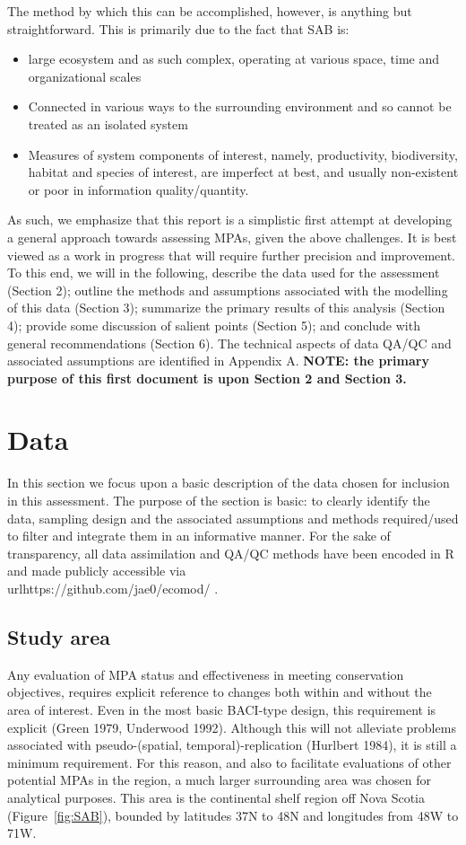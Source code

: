 \documentclass[letterpaper,portrait,11pt]{scrartcl}
\numberwithin{equation}{section}		%
\numberwithin{figure}{section}		%
\numberwithin{table}{section}				%
\begin{document}
The method by which this can be accomplished, however, is anything but straightforward. This is primarily due to the fact that SAB is:

\begin{itemize}
	\item large ecosystem and as such complex, operating at various space, time and organizational scales
	\item Connected in various ways to the surrounding environment and so cannot be treated as an isolated system
	\item Measures of system components of interest, namely, productivity, biodiversity, habitat and species of interest, are imperfect at best, and usually non-existent or poor in information quality/quantity.
\end{itemize}

As such, we emphasize that this report is a simplistic first attempt at developing a general approach towards assessing MPAs, given the above challenges. It is best viewed as a work in progress that will require further precision and improvement.
To this end, we will in the following, describe the data used for the assessment (Section 2); outline the methods and assumptions associated with the modelling of this data (Section 3); summarize the primary results of this analysis (Section 4); provide some discussion of salient points (Section 5); and conclude with general recommendations (Section 6). The technical aspects of data QA/QC and associated assumptions are identified in Appendix A.
\textbf{NOTE: the primary purpose of this first document is upon Section 2 and Section 3. }

\section{Data} 
In this section we focus upon a basic description of the data chosen for inclusion in this assessment. The purpose of the section is basic: to clearly identify the data, sampling design and the associated assumptions and methods required/used to filter and integrate them in an informative manner. For the sake of transparency, all data assimilation and QA/QC methods have been encoded in R \cite{rCran} and made publicly accessible via \\url{https://github.com/jae0/ecomod/} . 


\subsection{Study area}
Any evaluation of MPA status and effectiveness in meeting conservation objectives, requires explicit reference to changes both within and without the area of interest. Even in the most basic BACI-type design, this requirement is explicit (Green 1979, Underwood 1992). Although this will not alleviate problems associated with pseudo-(spatial, temporal)-replication (Hurlbert 1984), it is still a minimum requirement. For this reason, and also to facilitate evaluations of other potential MPAs in the region, a much larger surrounding area was chosen for analytical purposes. This area is the continental shelf region off Nova Scotia (Figure~\ref{fig:SAB}), bounded by latitudes 37N to 48N and longitudes from 48W to 71W.  
\end{document}
